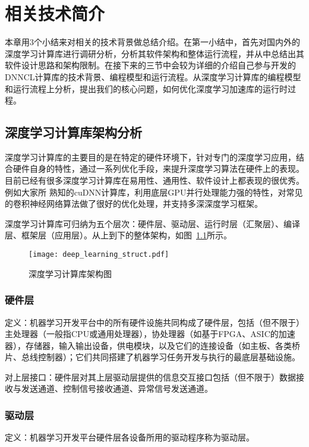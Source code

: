 
\chapter{相关技术简介}
本章用3个小结来对相关的技术背景做总结介绍。在第一小结中，首先对国内外的深度学习计算库进行调研分析，分析其软件架构和整体运行流程，并从中总结出其软件设计思路和架构限制。在接下来的三节中会较为详细的介绍自己参与开发的DNNCL计算库的技术背景、编程模型和运行流程。从深度学习计算库的编程模型和运行流程上分析，提出我们的核心问题，如何优化深度学习加速库的运行时过程。

\section{深度学习计算库架构分析}
深度学习计算库的主要目的是在特定的硬件环境下，针对专门的深度学习应用，结合硬件自身的特性，通过一系列优化手段，来提升深度学习算法在硬件上的表现。目前已经有很多深度学习计算库在易用性、通用性、软件设计上都表现的很优秀。例如大家所
熟知的cuDNN计算库，利用底层GPU并行处理能力强的特性，对常见的卷积神经网络算法做了很好的优化处理，并支持多深深度学习框架。

深度学习计算库可归纳为五个层次：硬件层、驱动层、运行时层（汇聚层）、编译层、框架层（应用层）。从上到下的整体架构，如图~\ref{fig:deep-learning-struct}所示。

\begin{figure}[htb]
  \centering
  \texttt{[image: deep\_learning\_struct.pdf]}
  \caption{深度学习计算库架构图}
  \label{fig:deep-learning-struct}
\end{figure}

\subsection {硬件层}
定义：机器学习开发平台中的所有硬件设施共同构成了硬件层，包括（但不限于）主处理器（一般指CPU或通用处理器），协处理器（如基于FPGA、ASIC的加速器），存储器，输入输出设备，供电模块，以及它们的连接设备（如主板、各类桥片、总线控制器）；它们共同搭建了机器学习任务开发与执行的最底层基础设施。

对上层接口：硬件层对其上层驱动层提供的信息交互接口包括（但不限于）数据接收与发送通道、控制信号接收通道、异常信号发送通道。

\subsection {驱动层}
定义：机器学习开发平台硬件层各设备所用的驱动程序称为驱动层。


